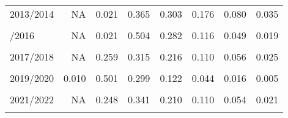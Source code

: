 \begin{table}[!h]
\begin{tabular}{lrrrrrrr}
2013/2014 & NA & 0.021 & 0.365 & 0.303 & 0.176 & 0.080 & 0.035\\
\cellcolor{gray!10}{2014/2015} & \cellcolor{gray!10}{NA} & \cellcolor{gray!10}{0.024} & \cellcolor{gray!10}{0.418} & \cellcolor{gray!10}{0.305} & \cellcolor{gray!10}{0.160} & \cellcolor{gray!10}{0.061} & \cellcolor{gray!10}{0.023}\\
\addlinespace
2015/2016 & NA & 0.021 & 0.504 & 0.282 & 0.116 & 0.049 & 0.019\\
\cellcolor{gray!10}{2016/2017} & \cellcolor{gray!10}{NA} & \cellcolor{gray!10}{0.082} & \cellcolor{gray!10}{0.396} & \cellcolor{gray!10}{0.278} & \cellcolor{gray!10}{0.133} & \cellcolor{gray!10}{0.066} & \cellcolor{gray!10}{0.029}\\
2017/2018 & NA & 0.259 & 0.315 & 0.216 & 0.110 & 0.056 & 0.025\\
\cellcolor{gray!10}{2018/2019} & \cellcolor{gray!10}{NA} & \cellcolor{gray!10}{0.346} & \cellcolor{gray!10}{0.332} & \cellcolor{gray!10}{0.175} & \cellcolor{gray!10}{0.086} & \cellcolor{gray!10}{0.035} & \cellcolor{gray!10}{0.016}\\
2019/2020 & 0.010 & 0.501 & 0.299 & 0.122 & 0.044 & 0.016 & 0.005\\
\addlinespace
\cellcolor{gray!10}{2020/2021} & \cellcolor{gray!10}{0.352} & \cellcolor{gray!10}{0.371} & \cellcolor{gray!10}{0.165} & \cellcolor{gray!10}{0.072} & \cellcolor{gray!10}{0.024} & \cellcolor{gray!10}{0.009} & \cellcolor{gray!10}{0.005}\\
2021/2022 & NA & 0.248 & 0.341 & 0.210 & 0.110 & 0.054 & 0.021\\
\cellcolor{gray!10}{2022/2023} & \cellcolor{gray!10}{0.003} & \cellcolor{gray!10}{0.387} & \cellcolor{gray!10}{0.314} & \cellcolor{gray!10}{0.156} & \cellcolor{gray!10}{0.077} & \cellcolor{gray!10}{0.038} & \cellcolor{gray!10}{0.014}\\
\bottomrule
\end{tabular}
\end{table}
